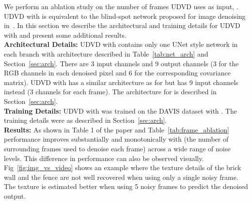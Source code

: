 \documentclass[final]{cvpr}
\begin{document}
We perform an ablation study on the number of frames  UDVD uses as input, . UDVD with  is equivalent to the blind-spot network proposed for image denoising in~\cite{blindspotnet}. In this section we describe the architectural and training details for UDVD with  and present some additional results. \\

\noindent \textbf{Architectural Details:} UDVD with  contains only one UNet style network in each branch with architecture described in Table~\ref{tab:net_arch} and Section~\ref{sec:arch}. There are 3 input channels and 9 output channels (3 for the RGB channels in each denoised pixel and 6 for the corresponding covariance matrix). UDVD with  has a similar architecture as for  but has 9 input channels instead (3 channels for each frame). The architecture for  is described in Section~\ref{sec:arch}.\\

\noindent \textbf{Training Details:} UDVD with  was trained on the DAVIS dataset with . The training details were as described in Section~\ref{sec:arch}. \\

\noindent \textbf{Results:} As shown in Table 1 of the paper and Table~\ref{tab:frame_ablation} performance improves substantially and monotonically with  (the number of surrounding frames used to denoise each frame) across a wide range of noise levels. This difference in performance can also be observed visually. Fig~\ref{fig:img_vs_video} shows an example where the texture details of the brick wall and the fence are not well recovered when using only a single noisy frame. The texture is estimated better when using 5 noisy frames to predict the denoised output. 


    
    
\end{document}
